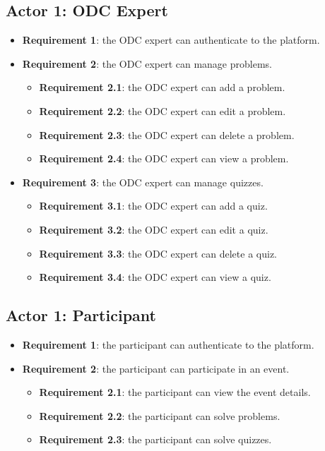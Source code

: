 \subsection{Actor 1: ODC Expert}
\begin{itemize}
      \item \textbf{Requirement 1}: the ODC expert can authenticate to the
            platform.
      \item \textbf{Requirement 2}: the ODC expert can manage problems.
            \begin{itemize}
                  \item \textbf{Requirement 2.1}: the ODC expert can add a problem.
                  \item \textbf{Requirement 2.2}: the ODC expert can edit a problem.
                  \item \textbf{Requirement 2.3}: the ODC expert can delete a problem.
                  \item \textbf{Requirement 2.4}: the ODC expert can view a problem.
            \end{itemize}
      \item \textbf{Requirement 3}: the ODC expert can manage quizzes.
            \begin{itemize}
                  \item \textbf{Requirement 3.1}: the ODC expert can add a quiz.
                  \item \textbf{Requirement 3.2}: the ODC expert can edit a quiz.
                  \item \textbf{Requirement 3.3}: the ODC expert can delete a quiz.
                  \item \textbf{Requirement 3.4}: the ODC expert can view a quiz.
            \end{itemize}
\end{itemize}

\subsection{Actor 1: Participant}
\begin{itemize}
      \item \textbf{Requirement 1}: the participant can authenticate to the
            platform.
      \item \textbf{Requirement 2}: the participant can participate in an event.
            \begin{itemize}
                  \item \textbf{Requirement 2.1}: the participant can view the event
                        details.
                  \item \textbf{Requirement 2.2}: the participant can solve problems.
                  \item \textbf{Requirement 2.3}: the participant can solve quizzes.
            \end{itemize}
\end{itemize}

